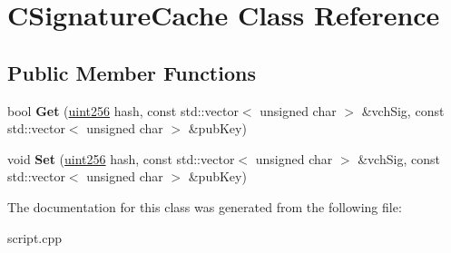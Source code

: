 \hypertarget{class_c_signature_cache}{}\section{C\+Signature\+Cache Class Reference}
\label{class_c_signature_cache}
\subsection*{Public Member Functions}
\begin{DoxyCompactItemize}
\item 
\mbox{\label{class_c_signature_cache_a0ca08f0e109b20aabc711021a1491800}} 
bool {\bfseries Get} (\mbox{\hyperlink{classuint256}{uint256}} hash, const std\+::vector$<$ unsigned char $>$ \&vch\+Sig, const std\+::vector$<$ unsigned char $>$ \&pub\+Key)
\item 
\mbox{\label{class_c_signature_cache_ad724e61341df0e53818a9e59e687b80b}} 
void {\bfseries Set} (\mbox{\hyperlink{classuint256}{uint256}} hash, const std\+::vector$<$ unsigned char $>$ \&vch\+Sig, const std\+::vector$<$ unsigned char $>$ \&pub\+Key)
\end{DoxyCompactItemize}


The documentation for this class was generated from the following file\+:\begin{DoxyCompactItemize}
\item 
script.\+cpp\end{DoxyCompactItemize}
